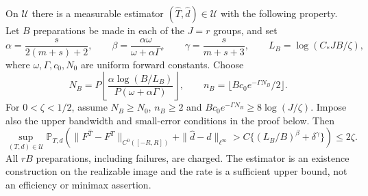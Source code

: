 \begin{theorem}
\label{thm:v72-sampling}
On $\mathscr U$ there is a measurable estimator
$(\widehat T,\widehat d)\in\mathscr U$ with the following property.
Let $B$ preparations be made in each of the $J=r$ groups, and set
\[
 \alpha=\frac{s}{2(m+s)+2},\qquad
 \beta=\frac{\alpha\omega}{\omega+\alpha\Gamma},\qquad
 \gamma=\frac{s}{m+s+3},\qquad L_B=\log(C_*JB/\zeta),
\]
where $\omega,\Gamma,c_0,N_0$ are uniform forward constants.
Choose
\[
 N_B=P\left\lfloor
 \frac{\alpha\log(B/L_B)}{P(\omega+\alpha\Gamma)}
 \right\rfloor,\qquad
 n_B=\lfloor Bc_0e^{-\Gamma N_B}/2\rfloor.
\]
For $0<\zeta<1/2$, assume $N_B\ge N_0$, $n_B\ge2$ and
$Bc_0e^{-\Gamma N_B}\ge8\log(J/\zeta)$.  Impose also the upper
bandwidth and small-error conditions in the proof below.  Then
\begin{equation}\label{eq:v72-rate}
 \sup_{(T,d)\in\mathscr U}\mathbb P_{T,d}\!\left(
 \|F^{\widehat T}-F^T\|_{C^0([-R,R])}
 +\|\widehat d-d\|_{\ell^\infty}
 >C\{(L_B/B)^\beta+\delta^\gamma\}\right)\le2\zeta.
\end{equation}
All $rB$ preparations, including failures, are charged.  The estimator
is an existence construction on the realizable image and the rate is a
sufficient upper bound, not an efficiency or minimax assertion.
\end{theorem}
